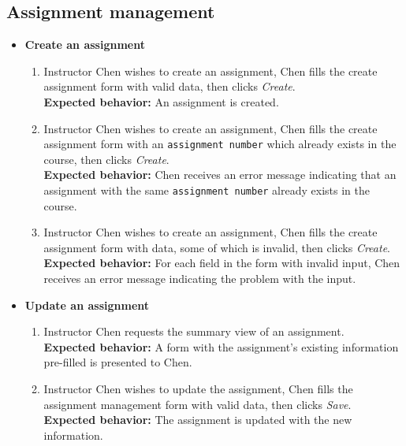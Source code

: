 \subsection{Assignment management}
\begin{itemize}
    \item \textbf{Create an assignment} \begin{enumerate}
        \item Instructor Chen wishes to create an assignment, Chen fills the
            create assignment form with valid data, then clicks \emph{Create}. \\
        {\bf Expected behavior:} An assignment is created.

        \item Instructor Chen wishes to create an assignment, Chen fills the
            create assignment form with an \texttt{assignment number}
            which already exists in the course, then clicks \emph{Create}. \\
        {\bf Expected behavior:} Chen receives an error message indicating
            that an assignment with the same \texttt{assignment number}
            already exists in the course.

        \item Instructor Chen wishes to create an assignment, Chen fills the
            create assignment form with data, some of which is invalid,
            then clicks \emph{Create}. \\
        {\bf Expected behavior:} For each field in the form with invalid input,
            Chen receives an error message indicating the problem with the
            input.
    \end{enumerate}

    \item \textbf{Update an assignment} \begin{enumerate}
        \item Instructor Chen requests the summary view of an assignment. \\
        {\bf Expected behavior:} A form with the assignment's existing
            information pre-filled is presented to Chen.

        \item Instructor Chen wishes to update the assignment, Chen fills the
            assignment management form with valid data, then clicks \emph{Save}. \\
        {\bf Expected behavior:} The assignment is updated with the new
            information.


\end{enumerate}
\end{itemize}
